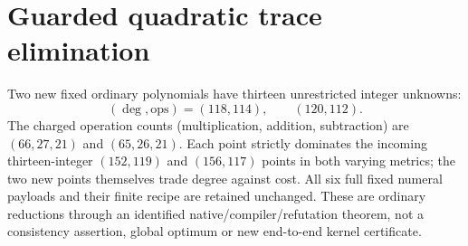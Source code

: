 \section{Guarded quadratic trace elimination}
\label{sec:guarded-trace-resultants}
Two new fixed ordinary polynomials have thirteen unrestricted integer unknowns:
\[
 (\deg,\mathrm{ops})=(118,114),\qquad (120,112).
\]
The charged operation counts (multiplication, addition, subtraction) are
$(66,27,21)$ and $(65,26,21)$. Each point strictly dominates the incoming
thirteen-integer $(152,119)$ and $(156,117)$ points in both varying metrics;
the two new points themselves trade degree against cost. All six full fixed
numeral payloads and their finite recipe are retained unchanged. These are
ordinary reductions through an identified native/compiler/refutation theorem,
not a consistency assertion, global optimum or new end-to-end kernel certificate.

